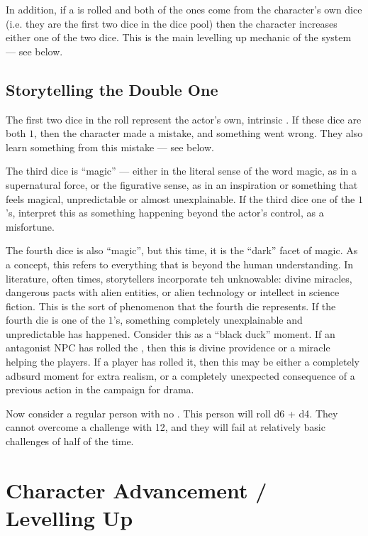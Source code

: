 In addition, if a  is rolled and both of the ones
come from the character's own dice (i.e. they are the first
two dice in the dice pool) then the character increases either
one of the two dice. This is the main levelling up mechanic of
the system --- see  below.

\subsection{Storytelling the Double One}
\label{subsec:storytelling_the_double_one}

The first two dice in the roll represent the actor's own, intrinsic .
If these dice are both $1$, then the character made a mistake, and something went wrong.
They also learn something from this mistake --- see  below.

The third dice is ``magic'' --- either in the literal sense of the word magic, as in a supernatural force,
or the figurative sense, as in an inspiration or something that feels magical, unpredictable or almost unexplainable.
If the third dice one of the $1$'s, interpret this as something happening beyond the actor's control, as a misfortune.

The fourth dice is also ``magic'', but this time, it is the ``dark'' facet of magic.
As a concept, this refers to everything that is beyond the human understanding.
In literature, often times, storytellers incorporate teh unknowable: divine miracles, dangerous pacts with alien entities, or alien technology or intellect in science fiction.
This is the sort of phenomenon that the fourth die represents.
If the fourth die is one of the $1$'s, something completely unexplainable and unpredictable has happened.
Consider this as a ``black duck'' moment.
If an antagonist NPC has rolled the , then this is divine providence or a miracle helping the players.
If a player has rolled it, then this may be either a completely adbsurd moment for extra realism, or a completely unexpected consequence of a previous action in the campaign for drama.


Now consider a regular person with no . This person will roll d6 + d4.
They cannot overcome a challenge with 12,
and they will fail at relatively basic challenges of  half of the time.

\section{Character Advancement / Levelling Up}

